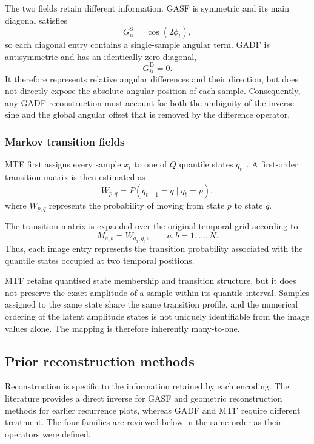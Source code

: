 \documentclass[5p]{elsarticle}
\begin{document}
The two fields retain different information. GASF is symmetric and its main diagonal satisfies
\[
G^{\mathrm{S}}_{ii}=\cos(2\phi_i),
\]
so each diagonal entry contains a single-sample angular term. GADF is antisymmetric and has an identically zero diagonal,
\[
G^{\mathrm{D}}_{ii}=0.
\]
It therefore represents relative angular differences and their direction, but does not directly expose the absolute angular position of each sample. Consequently, any GADF reconstruction must account for both the ambiguity of the inverse sine and the global angular offset that is removed by the difference operator.

\subsubsection{Markov transition fields}
\label{sec:mtf_definition}

MTF first assigns every sample \(x_t\) to one of \(Q\) quantile states \(q_t\)~\cite{wang2015encoding}. A first-order transition matrix is then estimated as
\[
W_{p,q}=P(q_{t+1}=q\mid q_t=p),
\]
where \(W_{p,q}\) represents the probability of moving from state \(p\) to state \(q\).

The transition matrix is expanded over the original temporal grid according to
\[
M_{a,b}=W_{q_a,q_b},
\qquad
a,b=1,\ldots,N.
\]
Thus, each image entry represents the transition probability associated with the quantile states occupied at two temporal positions.

MTF retains quantised state membership and transition structure, but it does not preserve the exact amplitude of a sample within its quantile interval. Samples assigned to the same state share the same transition profile, and the numerical ordering of the latent amplitude states is not uniquely identifiable from the image values alone. The mapping is therefore inherently many-to-one.

\subsection{Prior reconstruction methods}
\label{sec:prior_reconstruction}

Reconstruction is specific to the information retained by each encoding. The literature provides a direct inverse for GASF and geometric reconstruction methods for earlier recurrence plots, whereas GADF and MTF require different treatment. The four families are reviewed below in the same order as their operators were defined.
\end{document}
